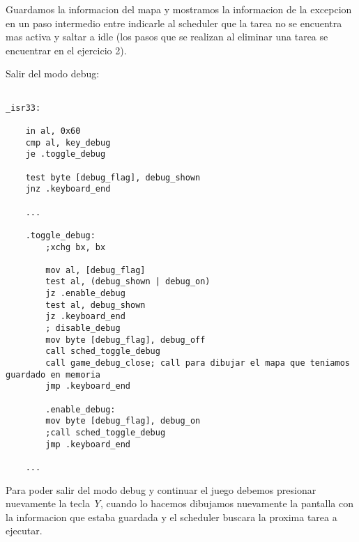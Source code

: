 	Guardamos la informacion del mapa y mostramos la informacion de la excepcion en un paso intermedio entre indicarle al scheduler que la tarea no se encuentra mas activa y saltar a idle (los pasos que se realizan al eliminar una tarea se encuentrar en el ejercicio 2).

	Salir del modo debug:

	\begin{lstlisting}

_isr33:

    in al, 0x60
    cmp al, key_debug
    je .toggle_debug

    test byte [debug_flag], debug_shown
    jnz .keyboard_end

    ...

    .toggle_debug:
        ;xchg bx, bx

        mov al, [debug_flag]
        test al, (debug_shown | debug_on)
        jz .enable_debug
        test al, debug_shown
        jz .keyboard_end
        ; disable_debug
        mov byte [debug_flag], debug_off
        call sched_toggle_debug
        call game_debug_close; call para dibujar el mapa que teniamos guardado en memoria
        jmp .keyboard_end

        .enable_debug:
        mov byte [debug_flag], debug_on
        ;call sched_toggle_debug
        jmp .keyboard_end

    ...
	\end{lstlisting}

	Para poder salir del modo debug y continuar el juego debemos presionar nuevamente la tecla \textit{Y}, cuando lo hacemos dibujamos nuevamente la pantalla con la informacion que estaba guardada y el scheduler buscara la proxima tarea a ejecutar.